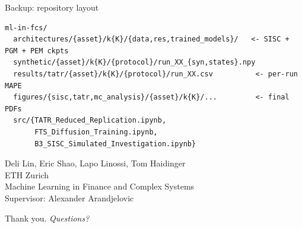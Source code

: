 \begin{frame}[fragile]{Backup: repository layout}
\footnotesize
\begin{verbatim}
ml-in-fcs/
  architectures/{asset}/k{K}/{data,res,trained_models}/   <- SISC + PGM + PEM ckpts
  synthetic/{asset}/k{K}/{protocol}/run_XX_{syn,states}.npy
  results/tatr/{asset}/k{K}/{protocol}/run_XX.csv          <- per-run MAPE
  figures/{sisc,tatr,mc_analysis}/{asset}/k{K}/...         <- final PDFs
  src/{TATR_Reduced_Replication.ipynb,
       FTS_Diffusion_Training.ipynb,
       B3_SISC_Simulated_Investigation.ipynb}
\end{verbatim}
\end{frame}

\begin{closingframe}

Deli Lin, Eric Shao, Lapo Linossi, Tom Haidinger\\
\medskip
ETH Zurich\\
Machine Learning in Finance and Complex Systems\\
Supervisor: Alexander Arandjelovic

\medskip

Thank you. \emph{Questions?}

\end{closingframe}
